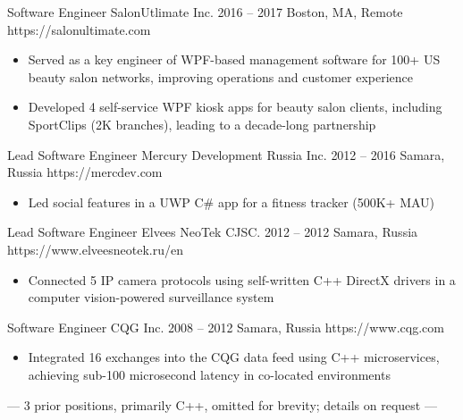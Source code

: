 \begin{paracol}{2}
    \cvLeftEvent
        {Software Engineer}
        {SalonUtlimate Inc.}
        {2016 -- 2017}
        {Boston, MA, Remote}
        {https://salonultimate.com}

        \begin{itemize}
            \item Served as a key engineer of WPF-based management software
                  for 100+ US beauty salon networks, improving operations and customer experience
            \item Developed 4 self-service WPF kiosk apps for beauty salon clients,
                  including SportClips (2K branches), leading to a decade-long partnership
        \end{itemize}

    \cvLeftEvent
        {Lead Software Engineer}
        {Mercury Development Russia Inc.}
        {2012 -- 2016}
        {Samara, Russia}
        {https://mercdev.com}

        \begin{itemize}
            \item Led social features in a UWP C\# app for a fitness tracker (500K+ MAU)
        \end{itemize}

    \cvLeftEvent
        {Lead Software Engineer}
        {Elvees NeoTek CJSC.}
        {2012 -- 2012}
        {Samara, Russia}
        {https://www.elveesneotek.ru/en}

        \begin{itemize}
            \item Connected 5 IP camera protocols using self-written C++ DirectX drivers
                  in a computer vision-powered surveillance system
        \end{itemize}

    \cvLeftEvent
        {Software Engineer}
        {CQG Inc.}
        {2008 -- 2012}
        {Samara, Russia}
        {https://www.cqg.com}

        \begin{itemize}
            \item Integrated 16 exchanges into the CQG data feed using C++ microservices,
                  achieving sub-100 microsecond latency in co-located environments
        \end{itemize}

    \vspace{2pt}
    \centerline{%
        \footnotesize
        \color{cvSecondaryTextColor}
        --- 3 prior positions, primarily C++, omitted for brevity; details on request ---
    }%


\end{paracol}
